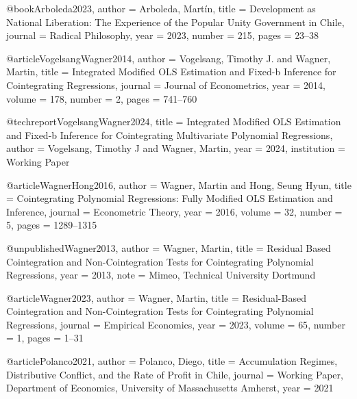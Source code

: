 @book{Arboleda2023,
	author  = {Arboleda, Mart{\'i}n},
	title   = {Development as National Liberation: The Experience of the {Popular Unity} Government in {Chile}},
	journal = {Radical Philosophy},
	year    = {2023},
	number  = {215},
	pages   = {23--38}
}

@article{VogelsangWagner2014,
	author  = {Vogelsang, Timothy J. and Wagner, Martin},
	title   = {Integrated Modified {OLS} Estimation and Fixed-b Inference for Cointegrating Regressions},
	journal = {Journal of Econometrics},
	year    = {2014},
	volume  = {178},
	number  = {2},
	pages   = {741--760}
}

@techreport{VogelsangWagner2024,
	title       = {Integrated Modified {OLS} Estimation and Fixed-b Inference for Cointegrating Multivariate Polynomial Regressions},
	author      = {Vogelsang, Timothy J and Wagner, Martin},
	year        = {2024},
	institution = {Working Paper}
}

@article{WagnerHong2016,
	author  = {Wagner, Martin and Hong, Seung Hyun},
	title   = {Cointegrating Polynomial Regressions: Fully Modified {OLS} Estimation and Inference},
	journal = {Econometric Theory},
	year    = {2016},
	volume  = {32},
	number  = {5},
	pages   = {1289--1315}
}

@unpublished{Wagner2013,
	author = {Wagner, Martin},
	title  = {Residual Based Cointegration and Non-Cointegration Tests for Cointegrating Polynomial Regressions},
	year   = {2013},
	note   = {Mimeo, Technical University Dortmund}
}

@article{Wagner2023,
	author  = {Wagner, Martin},
	title   = {Residual-Based Cointegration and Non-Cointegration Tests for Cointegrating Polynomial Regressions},
	journal = {Empirical Economics},
	year    = {2023},
	volume  = {65},
	number  = {1},
	pages   = {1--31}
}

@article{Polanco2021,
	author  = {Polanco, Diego},
	title   = {Accumulation Regimes, Distributive Conflict, and the Rate of Profit in Chile},
	journal = {Working Paper, Department of Economics, University of Massachusetts Amherst},
	year    = {2021}
}